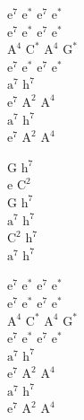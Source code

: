 \begin{chord}
$\mathrm{e^7}$ $\mathrm{e^*}$ $\mathrm{e^7}$ $\mathrm{e^*}$\\
$\mathrm{e^7}$ $\mathrm{e^*}$ $\mathrm{e^7}$ $\mathrm{e^*}$\\
$\mathrm{A^4}$ $\mathrm{C^*}$ $\mathrm{A^4}$ $\mathrm{G^*}$\\
$\mathrm{e^7}$ $\mathrm{e^*}$ $\mathrm{e^7}$ $\mathrm{e^*}$\\
$\mathrm{a^7}$ $\mathrm{h^7}$\\
$\mathrm{e^7}$ $\mathrm{A^2}$ $\mathrm{A^4}$\\
$\mathrm{a^7}$ $\mathrm{h^7}$\\
$\mathrm{e^7}$ $\mathrm{A^2}$ $\mathrm{A^4}$

G $\mathrm{h^7}$\\
e $\mathrm{C^2}$\\
G $\mathrm{h^7}$\\
$\mathrm{a^7}$ $\mathrm{h^7}$\\
$\mathrm{C^2}$ $\mathrm{h^7}$\\
$\mathrm{a^7}$ $\mathrm{h^7}$

$\mathrm{e^7}$ $\mathrm{e^*}$ $\mathrm{e^7}$ $\mathrm{e^*}$\\
$\mathrm{e^7}$ $\mathrm{e^*}$ $\mathrm{e^7}$ $\mathrm{e^*}$\\
$\mathrm{A^4}$ $\mathrm{C^*}$ $\mathrm{A^4}$ $\mathrm{G^*}$\\
$\mathrm{e^7}$ $\mathrm{e^*}$ $\mathrm{e^7}$ $\mathrm{e^*}$\\
$\mathrm{a^7}$ $\mathrm{h^7}$\\
$\mathrm{e^7}$ $\mathrm{A^2}$ $\mathrm{A^4}$\\
$\mathrm{a^7}$ $\mathrm{h^7}$\\
$\mathrm{e^7}$ $\mathrm{A^2}$ $\mathrm{A^4}$
\end{chord}
